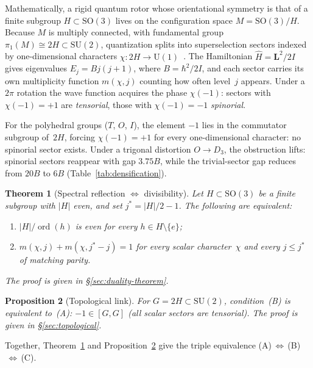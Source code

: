 \documentclass[12pt]{article}
\newtheorem{theorem}{Theorem}[section]
\newtheorem{proposition}[theorem]{Proposition}
\theoremstyle{definition}
\theoremstyle{remark}
\newcommand{\SU}{\mathrm{SU}}
\newcommand{\SO}{\mathrm{SO}}
\newcommand{\UU}{\mathrm{U}}
\DeclareMathOperator{\ord}{ord}
\begin{document}
Mathematically, a rigid quantum rotor whose orientational
symmetry is that of a
finite subgroup $H \subset \SO(3)$
lives on the configuration space $M = \SO(3)/H$.
Because $M$ is multiply connected, with fundamental group
$\pi_1(M) \cong 2H \subset \SU(2)$, quantization splits into
superselection sectors indexed by one-dimensional characters
$\chi \colon 2H \to \UU(1)$~\cite{Schulman1968, LaidlawDeWitt1971,
Dowker1972, Isham1984}.
The Hamiltonian $\hat{H} = \mathbf{L}^2/2I$ gives eigenvalues
$E_j = Bj(j{+}1)$, where $B = \hbar^2/2I$, and each sector
carries its own multiplicity function
$m(\chi,j)$ counting how often level~$j$ appears.
Under a $2\pi$ rotation the wave function acquires the phase
$\chi(-1)$: sectors with $\chi(-1) = +1$ are
\emph{tensorial}, those with $\chi(-1) = -1$ \emph{spinorial}.

For the polyhedral groups ($T$, $O$, $I$), the element
$-1$ lies in the commutator subgroup of~$2H$, forcing
$\chi(-1) = +1$ for every one-dimensional character:
no spinorial sector exists.
Under a trigonal distortion $O \to D_3$, the obstruction lifts:
spinorial sectors reappear with gap $3.75B$, while the
trivial-sector gap reduces from $20B$ to $6B$
(Table~\ref{tab:densification}).

\begin{theorem}[Spectral reflection $\Leftrightarrow$ divisibility]
\label{thm:main}
Let $H \subset \SO(3)$ be a finite subgroup with
$|H|$ even, and set $j^* = |H|/2 - 1$.
The following are equivalent:
\begin{enumerate}
  \item[\textup{(B)}] $|H|/\ord(h)$ is even for every
    $h \in H \setminus\{e\}$;
  \item[\textup{(C)}] $m(\chi,j) + m(\chi, j^*{-}j) = 1$
    for every scalar character~$\chi$ and every
    $j \le j^*$ of matching parity.
\end{enumerate}
The proof is given in \S\ref{sec:duality-theorem}.
\end{theorem}

\begin{proposition}[Topological link]
\label{prop:intro-A-iff-B}
For $G = 2H \subset \SU(2)$, condition~\textup{(B)} is
equivalent to~\textup{(A)}: $-1 \in [G,G]$
\textup{(}all scalar sectors are tensorial\textup{)}.
The proof is given in \S\ref{sec:topological}.
\end{proposition}

\noindent
Together, Theorem~\ref{thm:main} and
Proposition~\ref{prop:intro-A-iff-B} give the triple equivalence
\textup{(A)}$\,\Leftrightarrow\,$\textup{(B)}$\,\Leftrightarrow\,$\textup{(C)}.
\end{document}
